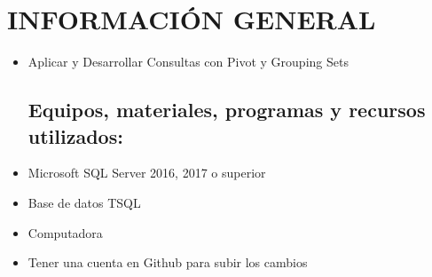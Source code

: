 \section{INFORMACIÓN GENERAL} 

\begin{itemize}
\subsection{Objetivos:}
	\item Aplicar y Desarrollar  Consultas con Pivot y Grouping Sets
\subsection{Equipos, materiales, programas y recursos utilizados:}
	\item Microsoft SQL Server 2016, 2017 o superior
	\item Base de datos TSQL
	\item Computadora
	\item Tener una cuenta en Github para subir los cambios


\end{itemize}